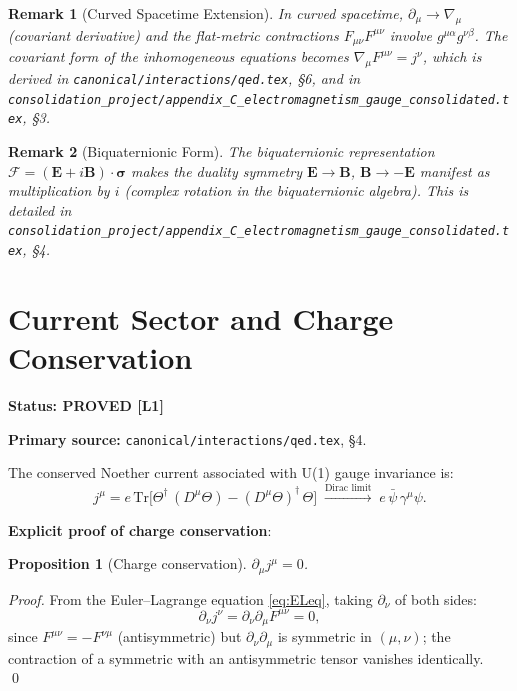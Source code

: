 \documentclass[11pt,a4paper]{article}
\newtheorem{proposition}{Proposition}
\newtheorem{remark}{Remark}
\newcommand{\Lone}{\textbf{[L1]}}
\newcommand{\PROVED}{\textbf{PROVED}}
\begin{document}
\begin{remark}[Curved Spacetime Extension]
In curved spacetime, $\partial_\mu \to \nabla_\mu$ (covariant derivative) and
the flat-metric contractions $F_{\mu\nu}F^{\mu\nu}$ involve $g^{\mu\alpha}g^{\nu\beta}$.
The covariant form of the inhomogeneous equations becomes
$\nabla_\mu F^{\mu\nu} = j^\nu$, which is derived in
\texttt{canonical/interactions/qed.tex}, \S6, and in
\texttt{consolidation\_project/appendix\_C\_electromagnetism\_gauge\_consolidated.tex}, \S3.
\end{remark}

\begin{remark}[Biquaternionic Form]
The biquaternionic representation $\mathcal{F} = (\mathbf{E}+i\mathbf{B})\cdot\boldsymbol{\sigma}$
makes the duality symmetry $\mathbf{E}\to\mathbf{B}$, $\mathbf{B}\to-\mathbf{E}$ manifest
as multiplication by $i$ (complex rotation in the biquaternionic algebra).
This is detailed in
\texttt{consolidation\_project/appendix\_C\_electromagnetism\_gauge\_consolidated.tex}, \S4.
\end{remark}

\section{Current Sector and Charge Conservation}

\noindent\textbf{Status: \PROVED{} \Lone}

\noindent\textbf{Primary source:}
\texttt{canonical/interactions/qed.tex}, \S4.

\medskip

The conserved Noether current associated with U(1) gauge invariance is:
\begin{equation}\label{eq:Noether}
  j^\mu = e\,\mathrm{Tr}\bigl[\Theta^\dagger\,(D^\mu\Theta) - (D^\mu\Theta)^\dagger\,\Theta\bigr]
  \;\xrightarrow{\text{Dirac limit}}\;
  e\,\bar\psi\,\gamma^\mu\psi.
\end{equation}

\noindent\textbf{Explicit proof of charge conservation}:
\begin{proposition}[Charge conservation]
$\partial_\mu j^\mu = 0$.
\end{proposition}
\begin{proof}
From the Euler--Lagrange equation \eqref{eq:ELeq},
taking $\partial_\nu$ of both sides:
\begin{equation}
  \partial_\nu j^\nu = \partial_\nu\partial_\mu F^{\mu\nu} = 0,
\end{equation}
since $F^{\mu\nu} = -F^{\nu\mu}$ (antisymmetric) but $\partial_\nu\partial_\mu$
is symmetric in $(\mu,\nu)$; the contraction of a symmetric with an antisymmetric
tensor vanishes identically. \qed
\end{proof}
\end{document}
